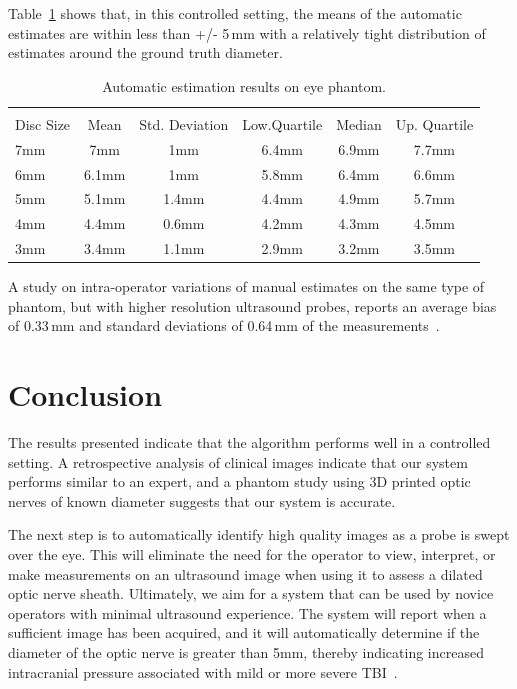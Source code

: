 \documentclass{llncs}
\begin{document}
Table~\ref{tab:phantom} shows that, in this controlled setting, the means of the
automatic estimates are within less than +/- 5\,mm with a relatively tight
distribution of estimates around the ground truth diameter. 
\begin{table}[bht]
\centering
\caption{
Automatic estimation results on eye phantom.
}
\label{tab:phantom}
\begin{tabular}{l|cc|ccc}
\\[-2.8ex] 
\hline  
\hline 
\\[-1.8ex]
Disc Size & Mean & Std. Deviation & Low.Quartile & Median & Up. Quartile \\
\hline
7mm & 7mm   & 1mm   & 6.4mm & 6.9mm & 7.7mm \\
6mm & 6.1mm & 1mm   & 5.8mm & 6.4mm & 6.6mm \\
5mm & 5.1mm & 1.4mm & 4.4mm & 4.9mm & 5.7mm \\
4mm & 4.4mm & 0.6mm & 4.2mm & 4.3mm & 4.5mm \\
3mm & 3.4mm & 1.1mm & 2.9mm & 3.2mm & 3.5mm \\
\hline 
\end{tabular}
\end{table}
A study on intra-operator variations of manual estimates on the same type of
phantom, but with higher resolution ultrasound probes, reports an average bias
of 0.33\,mm and standard deviations of 0.64\,mm of the
measurements~\cite{Jo2016}.  


\section{Conclusion}
The results presented indicate that the algorithm performs well in a controlled
setting.  A retrospective analysis of clinical images indicate that our system
performs similar to an expert, and a phantom study using 3D printed optic
nerves of known diameter suggests that our system is accurate.

The next step is to automatically identify high quality images as a probe is
swept over the eye. This will eliminate the need for the operator to view,
interpret, or make measurements on an ultrasound image when using it to assess
a dilated optic nerve sheath. Ultimately, we aim for a system that can be used
by novice operators with minimal ultrasound experience. The system will report
when a sufficient image has been acquired, and it will automatically determine
if the diameter of the optic nerve is greater than 5mm, thereby indicating
increased intracranial pressure associated with mild or more severe
TBI~\cite{Ma2015}.
\end{document}
